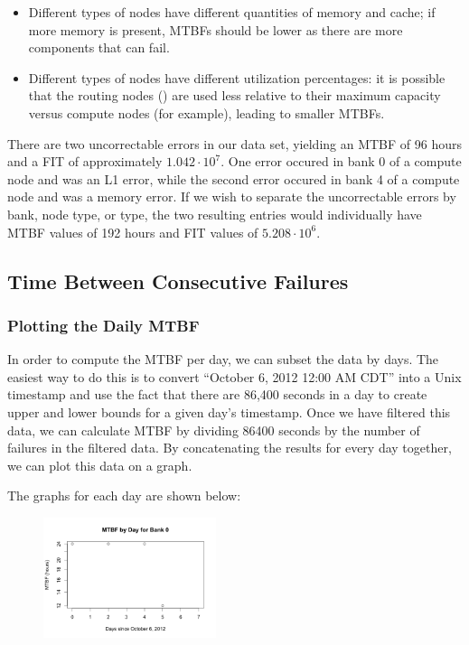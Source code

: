 \begin{itemize}
\item Different types of nodes have different quantities of memory and cache; if more memory is present, MTBFs should be lower as there are more components that can fail.
\item Different types of nodes have different utilization percentages: it is possible that the routing nodes () are used less relative to their maximum capacity versus compute nodes (for example), leading to smaller MTBFs.
\end{itemize}

There are two uncorrectable errors in our data set, yielding an MTBF of 96 hours and a FIT of approximately $1.042 \cdot 10^7$.  One error occured in bank 0 of a compute node and was an L1 error, while the second error occured in bank 4 of a compute node and was a memory error.  If we wish to separate the uncorrectable errors by bank, node type, or type, the two resulting entries would individually have MTBF values of 192 hours and FIT values of $5.208 \cdot 10^6$.

\subsection{Time Between Consecutive Failures}
\subsubsection{Plotting the Daily MTBF}

In order to compute the MTBF per day, we can subset the data by days.  The easiest way to do this is to convert ``October 6, 2012 12:00 AM CDT'' into a Unix timestamp and use the fact that there are 86,400 seconds in a day to create upper and lower bounds for a given day's timestamp.  Once we have filtered this data, we can calculate MTBF by dividing 86400 seconds by the number of failures in the filtered data.  By concatenating the results for every day together, we can plot this data on a graph.

The graphs for each day are shown below:

\begin{figure}
\centering
\includegraphics[width=0.45\textwidth]{images/mtbf_0.png}
\end{figure}

